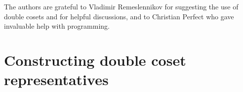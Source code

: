 \documentclass[a4paper,12pt]{article}
\numberwithin{equation}{section}
\numberwithin{figure}{section}
\newcommand{\FF}{\ensuremath{\mathbb{F}}}
\newcommand{\la}{\langle}
\newcommand{\ra}{\rangle}
\newcommand{\be}{\begin{enumerate}}
\newcommand{\ee}{\end{enumerate}}
\begin{document}
The authors are grateful to Vladimir Remeslennikov for suggesting the use of double
cosets and
for helpful
discussions,  and to Christian Perfect who gave invaluable help with programming.

\section{Constructing double coset representatives}\label{sec:dcforms}
\end{document}
